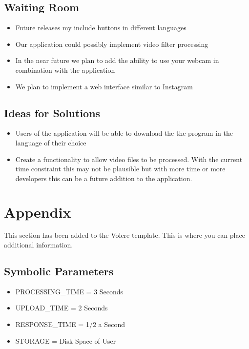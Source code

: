 \documentclass[12pt, titlepage]{article}
\begin{document}
\subsection{Waiting Room}

\begin{itemize}	
\item Future releases my include buttons in different languages
\item Our application could possibly implement video filter processing
\item In the near future we plan to add the ability to use your webcam in combination with the application
\item We plan to implement a web interface similar to Instagram
\end{itemize}

\subsection{Ideas for Solutions}

\begin{itemize}
\item Users of the application will be able to download the the program in the language of their choice
\item Create a functionality to allow video files to be processed. With the current time constraint this may not be plausible but with more time or more developers this can be a future addition to the application.
\end{itemize}

\section{Appendix}

This section has been added to the Volere template.  This is where you can place
additional information.

\subsection{Symbolic Parameters}

\begin{itemize}
\item PROCESSING\_TIME = 3 Seconds
\item UPLOAD\_TIME = 2 Seconds
\item RESPONSE\_TIME = 1/2 a Second
\item STORAGE = Disk Space of User
\end{itemize}
\end{document}
